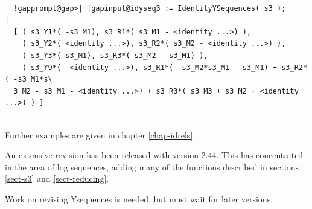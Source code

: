 \documentclass[a4paper,11pt]{report}
\begin{document}
{{ 
\begin{Verbatim}[commandchars=!@|,fontsize=\small,frame=single,label=Example]
  
  !gapprompt@gap>| !gapinput@idyseq3 := IdentityYSequences( s3 );     |
  [ ( s3_Y1*( -s3_M1), s3_R1*( s3_M1 - <identity ...>) ), 
    ( s3_Y2*( <identity ...>), s3_R2*( s3_M2 - <identity ...>) ), 
    ( s3_Y3*( s3_M1), s3_R3*( s3_M2 - s3_M1) ), 
    ( s3_Y9*( -<identity ...>), s3_R1*( -s3_M2*s3_M1 - s3_M1) + s3_R2*( -s3_M1*s\
  3_M2 - s3_M1 - <identity ...>) + s3_R3*( s3_M3 + s3_M2 + <identity ...>) ) ]
  
\end{Verbatim}
 Further examples are given in chapter \ref{chap-idrels}. 

 An extensive revision has been released with version 2.44. This has
concentrated in the area of log sequences, adding many of the functions
described in sections \ref{sect-s3} and \ref{sect-reducing}. 

 Work on revising Y\texttt{}sequences is needed, but must wait for
later versions. }

 }

       
\end{document}
